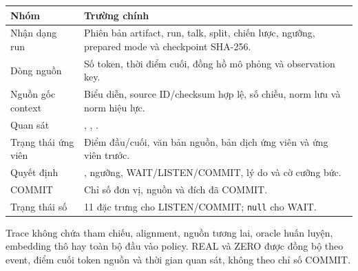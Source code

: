 \documentclass[11pt,a4paper]{article}
\numberwithin{figure}{section}
\numberwithin{table}{section}
\begin{document}
\begin{center}
\small
\begin{tabularx}{\textwidth}{@{}L{0.28\textwidth}Y@{}}
  \toprule
  \textbf{Nhóm} & \textbf{Trường chính} \\
  \midrule
  Nhận dạng run & Phiên bản artifact, run, talk, split, chiến lược, ngưỡng, prepared mode và checkpoint SHA-256. \\
  Dòng nguồn & Số token, thời điểm cuối, đồng hồ mô phỏng và observation key. \\
  Nguồn gốc context & Biểu diễn, source ID/checksum hợp lệ, số chiều, norm lưu và norm hiệu lực. \\
  Quan sát & , , . \\
  Trạng thái ứng viên & Điểm đầu/cuối, văn bản nguồn, bản dịch ứng viên và ứng viên trước. \\
  Quyết định & , ngưỡng, WAIT/LISTEN/COMMIT, lý do và cờ cưỡng bức. \\
  COMMIT & Chỉ số đơn vị, nguồn và đích đã COMMIT. \\
  Trạng thái số & 11 đặc trưng cho LISTEN/COMMIT; \texttt{null} cho WAIT. \\
  \bottomrule
\end{tabularx}
\end{center}

Trace không chứa tham chiếu, alignment, nguồn tương lai, oracle huấn luyện, embedding thô hay toàn bộ đầu vào policy. REAL và ZERO được đồng bộ theo event, điểm cuối token nguồn và thời gian quan sát, không theo chỉ số COMMIT.
\end{document}
